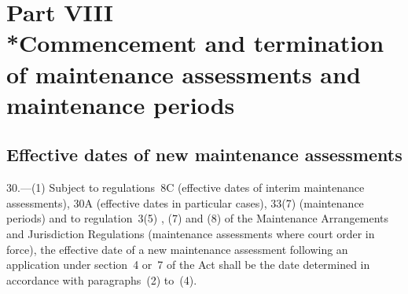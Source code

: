 \documentclass[a4paper,12pt]{article}
\begin{document}
\section[Part VIII --- Commencement and termination of maintenance assessments and maintenance periods]{\sloppy Part VIII\\*Commencement and termination of maintenance assessments and maintenance periods}

\renewcommand\parthead{--- Part VIII}

\subsection[30. Effective dates of new maintenance assessments]{Effective dates of new maintenance assessments}

30.—(1) Subject to 
regulations~8C (effective dates of interim maintenance assessments), 30A (effective dates in particular cases), 33(7) (maintenance periods)  %
and to regulation~3(5)%
, (7) and (8)  %
of the Maintenance Arrangements and Jurisdiction Regulations (maintenance assessments where court order in force),  %
 the effective date of a new maintenance assessment following an application under section~4
or~7 of the Act shall be the date determined in accordance with paragraphs~(2) to~(4).

%
%
\end{document}
